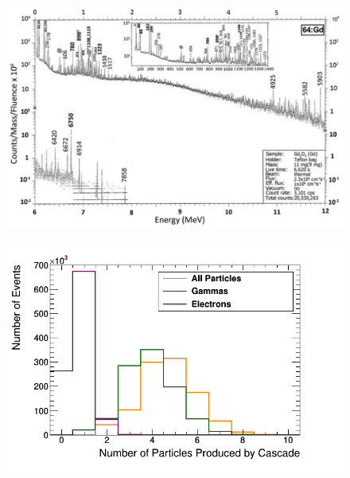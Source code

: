 

\begin{figure}[H]
 \centering
 \includegraphics[width=0.7\linewidth]{Chapter4/Figs/Raster/gadolinium/naturalGd.png}
 \label{fig:naturalGd.png}
\end{figure}

\begin{figure}[H]
 \centering
 \includegraphics[width=0.7\linewidth]{Chapter4/Figs/Raster/gadolinium/gadoliniumMultipliciesBreakdownCascade.png}
 \label{fig:gadoliniumMultipliciesBreakdownCascade}
\end{figure}

